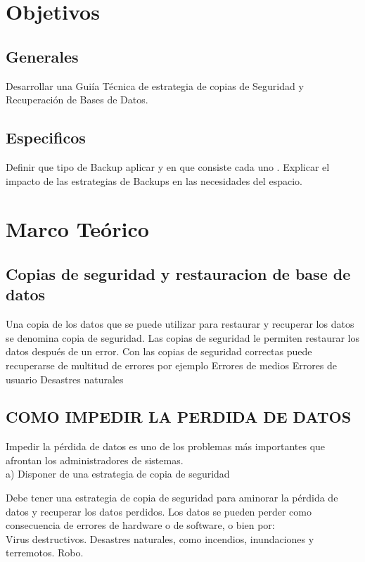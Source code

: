 \documentclass[a4paper,twocolumn,10pt]{article}
\begin{document}
\section{Objetivos}

    \subsection{Generales}
       \normalsize Desarrollar una Gui\'ia T\'ecnica de estrategia de copias de Seguridad y Recuperaci\'on de Bases de Datos.
    \subsection{Especificos}
       \normalsize Definir que tipo de Backup aplicar y en que consiste cada uno . Explicar el impacto de las estrategias de Backups en las necesidades del espacio.

\section{Marco Te\'orico}
	 \subsection{Copias de seguridad y restauracion de base de datos}
Una copia de los datos que se puede utilizar para restaurar y recuperar los datos se denomina copia de seguridad. Las copias de seguridad le permiten restaurar los datos después de un error. Con las copias de seguridad correctas puede recuperarse de multitud de errores por ejemplo
		\normalsize Errores de medios
		\normalsize Errores de usuario
		\normalsize Desastres naturales

	 \subsection{COMO IMPEDIR LA PERDIDA DE DATOS}
Impedir la pérdida de datos es uno de los problemas más importantes que afrontan los administradores de sistemas.\\
a) Disponer de una estrategia de copia de seguridad

Debe tener una estrategia de copia de seguridad para aminorar la pérdida de datos y recuperar los datos perdidos. Los datos se pueden perder como consecuencia de errores de hardware o de software, o bien por:\\

\normalsize Virus destructivos.
\normalsize Desastres naturales, como incendios, inundaciones y terremotos.
\normalsize Robo.
\end{document}
